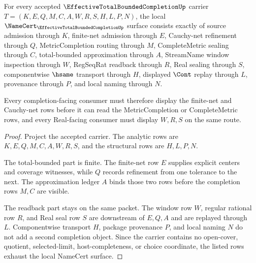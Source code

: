 \begin{theorem}
\label{thm:effective-total-bounded-completion-namecert-obligations}
For every accepted $\EffectiveTotalBoundedCompletionUp$ carrier $T=(K,E,Q,M,C,A,W,R,S,H,L,P,N)$, the local $\NameCert_{\EffectiveTotalBoundedCompletionUp}$ surface consists exactly of source admission through $K$, finite-net admission through $E$, Cauchy-net refinement through $Q$, MetricCompletion routing through $M$, CompleteMetric sealing through $C$, total-bounded approximation through $A$, StreamName window inspection through $W$, RegSeqRat readback through $R$, Real sealing through $S$, componentwise $\hsame$ transport through $H$, displayed $\Cont$ replay through $L$, provenance through $P$, and local naming through $N$.

Every completion-facing consumer must therefore display the finite-net and Cauchy-net rows before it can read the MetricCompletion or CompleteMetric rows, and every Real-facing consumer must display $W,R,S$ on the same route.
\end{theorem}
\begin{proof}
Project the accepted carrier. The analytic rows are $K,E,Q,M,C,A,W,R,S$, and the structural rows are $H,L,P,N$.

The total-bounded part is finite. The finite-net row $E$ supplies explicit centers and coverage witnesses, while $Q$ records refinement from one tolerance to the next. The approximation ledger $A$ binds those two rows before the completion rows $M,C$ are visible.

The readback part stays on the same packet. The window row $W$, regular rational row $R$, and Real seal row $S$ are downstream of $E,Q,A$ and are replayed through $L$. Componentwise transport $H$, package provenance $P$, and local naming $N$ do not add a second completion object. Since the carrier contains no open-cover, quotient, selected-limit, host-completeness, or choice coordinate, the listed rows exhaust the local NameCert surface.
\end{proof}

